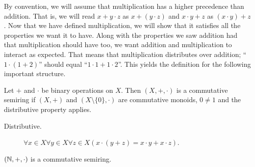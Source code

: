 \documentclass[../main.tex]{subfiles}
\begin{document}
By convention, we will assume that multiplication has a higher precedence than addition. That is, we will read $x+y\cdot z$ as $x+(y\cdot z)$ and $x\cdot y+z$ as $(x\cdot y)+z$. Now that we have defined multiplication, we will show that it satisfies all the properties we want it to have. Along with the properties we saw addition had that multiplication should have too, we want addition and multiplication to interact as expected. That means that multiplication distributes over addition; ``$1\cdot(1+2)$'' should equal ``$1\cdot 1+1\cdot 2$''. This yields the definition for the following important structure.
\begin{definition}
    Let $+$ and $\cdot$ be binary operations on $X$. Then $(X,+,\cdot)$ is a commutative semiring if $(X,+)$ and $(X\setminus\{0\},\cdot)$ are commutative monoids, $0\neq1$ and the distributive property applies.
    \begin{description}
        \item[Distributive.] $\forall x\in X\forall y\in X\forall z\in X(x\cdot(y+z)=x\cdot y+x\cdot z)$.
    \end{description}
\end{definition}
\begin{proposition}\label{prp:the_natural_numbers_integers_and_rational_numbers:commutative_semiring_natural_numbers}
    $(\mathbb{N},+,\cdot)$ is a commutative semiring.
\end{proposition}
\end{document}
